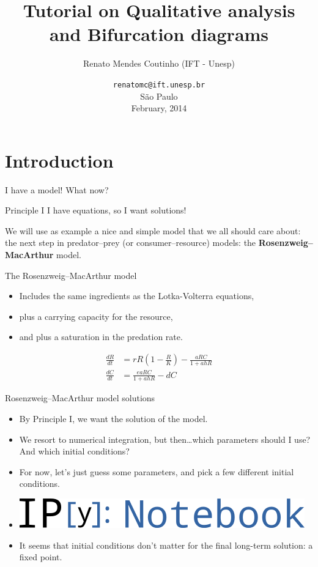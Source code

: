 \documentclass{beamer}
\title[Bifurcation diagrams]{Tutorial on Qualitative analysis and Bifurcation diagrams}
\author[Renato Coutinho]{Renato Mendes Coutinho (IFT - Unesp)}
\date[SSSMB 2014] %
{
    {\footnotesize \texttt{renatomc@ift.unesp.br}}\\
\vspace{0.5cm}S\~ao Paulo\\February, 2014}
\begin{document}
\begin{frame}
    \titlepage
\end{frame}

\begin{frame}{}
    \tableofcontents
\end{frame}

\section{Introduction}

\begin{frame}{I have a model! What now?}
    \pause
    \begin{block}{Principle I}
        I have equations, so I want solutions!
    \end{block}
    \pause
    \vfill
    We will use as example a nice and simple model that we all should care
    about: the next step in predator--prey (or consumer--resource) models: the
    \textbf{Rosenzweig--MacArthur} model.
\end{frame}

\begin{frame}{The Rosenzweig--MacArthur model}
    \begin{itemize}
        \item Includes the same ingredients as the Lotka-Volterra equations,
        \item plus a carrying capacity for the resource,
        \item and plus a saturation in the predation rate.
    \end{itemize}
    \pause
    \begin{align*}
        \frac{dR}{dt} &= rR \left( 1 - \frac{R}{K} \right) - \frac{a R C}{1+ahR} \\
        \frac{dC}{dt} &= \frac{e a R C}{1+ahR} - d C
    \end{align*}
\end{frame}

\begin{frame}{Rosenzweig--MacArthur model solutions}
    \begin{itemize}
        \item By Principle I, we want the solution of the model.
        \item We resort to numerical integration, but then\ldots which
            parameters should I use? And which initial conditions?
        \item For now, let's just guess some parameters, and pick a few
            different initial conditions.
        \item
            \includegraphics[height=1.5ex]{ipynblogo.png}
            \pause
        \item It seems that initial conditions don't matter for the final
            long-term solution: a fixed point.
    \end{itemize}
\end{frame}
\end{document}
